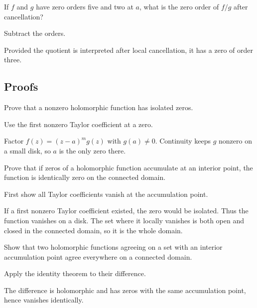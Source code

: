 \begin{exercise}\label{exr:iv07-expand-05}
If \(f\) and \(g\) have zero orders five and two at \(a\), what is the zero order of \(f/g\) after cancellation?
\end{exercise}
\begin{hint}
Subtract the orders.
\end{hint}
\begin{solution}
Provided the quotient is interpreted after local cancellation, it has a zero of order three.
\end{solution}

\subsection*{Proofs}

\begin{exercise}\label{exr:iv07-expand-06}
Prove that a nonzero holomorphic function has isolated zeros.
\end{exercise}
\begin{hint}
Use the first nonzero Taylor coefficient at a zero.
\end{hint}
\begin{solution}
Factor \(f(z)=(z-a)^m g(z)\) with \(g(a)\ne0\). Continuity keeps \(g\) nonzero on a small disk, so \(a\) is the only zero there.
\end{solution}

\begin{exercise}\label{exr:iv07-expand-07}
Prove that if zeros of a holomorphic function accumulate at an interior point, the function is identically zero on the connected domain.
\end{exercise}
\begin{hint}
First show all Taylor coefficients vanish at the accumulation point.
\end{hint}
\begin{solution}
If a first nonzero Taylor coefficient existed, the zero would be isolated. Thus the function vanishes on a disk. The set where it locally vanishes is both open and closed in the connected domain, so it is the whole domain.
\end{solution}

\begin{exercise}\label{exr:iv07-expand-08}
Show that two holomorphic functions agreeing on a set with an interior accumulation point agree everywhere on a connected domain.
\end{exercise}
\begin{hint}
Apply the identity theorem to their difference.
\end{hint}
\begin{solution}
The difference is holomorphic and has zeros with the same accumulation point, hence vanishes identically.
\end{solution}


